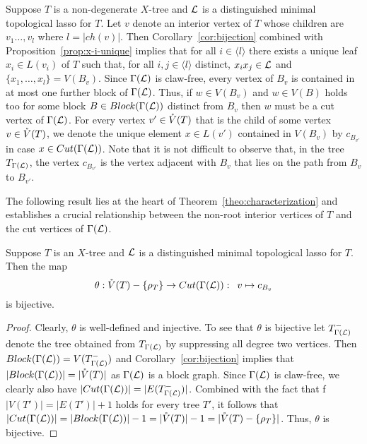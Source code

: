 Suppose $T$ is a non-degenerate $X$-tree and
${\mathcal L}$ is a distinguished minimal topological lasso for $T$. 
Let $v$ denote an interior vertex of $T$ whose children are 
$v_1\ldots,v_l$ where $l=|ch(v)|$. Then
 Corollary~\ref{cor:bijection} combined with 
Proposition~\ref{prop:x-i-unique} implies that for all $i\in\langle l\rangle$
there exists a unique leaf $x_i\in L(v_i)$ of $T$ such that, 
for all $i,j\in\langle l\rangle$ distinct,
 $x_ix_j\in {\mathcal L}$ and 
$\{x_1,\ldots, x_l\}=V(B_v)$. Since $\Gamma({\mathcal L})$ is claw-free, 
every vertex of $B_v$  is contained in at most one further block
of $\Gamma({\mathcal L})$. Thus, if $w\in V(B_v)$ and
$w\in V(B) $ holds too for some block $B\in Block(\Gamma({\mathcal L}))$
distinct from $B_v$
then $w$ must be a cut vertex of $\Gamma({\mathcal L})$. For every 
vertex $v'\in \mathring{V}(T)$ that is the
child of some vertex $v\in \mathring{V}(T)$, we denote the  
unique element $x\in L(v')$ contained
in $V(B_v)$ by $c_{B_{v'}}$ in case $x\in Cut(\Gamma({\mathcal L}))$.
Note that it is not difficult to observe that,  in the tree 
$T_{\Gamma({\mathcal L})}$, the vertex $c_{B_{v'}}$ is the vertex 
adjacent with $B_v$ that lies on the path 
from $B_v$ to $B_{v'}$. 

The following result lies at the heart of 
Theorem~\ref{theo:characterization} and establishes a 
crucial relationship between the non-root interior vertices of $T$ 
and the cut vertices of $\Gamma({\mathcal L})$.

\begin{lem}\label{lem:bijection-theta}
Suppose $T$ is an $X$-tree and ${\mathcal L}$ is a distinguished minimal 
topological lasso
for $T$. Then  the map 
$$
\theta :\mathring{V}(T)-\{\rho_T\} \to Cut(\Gamma({\mathcal L})):\,\,\,v\mapsto c_{B_{v}}
$$ 
is bijective. 
\end{lem}
\begin{proof}
Clearly, $\theta$ is well-defined and injective. To see that $\theta$ is 
bijective
let $ T_{\Gamma({\mathcal L})}^-$ denote the tree obtained from
$ T_{\Gamma({\mathcal L})}$ by suppressing all degree two vertices. Then 
$Block(\Gamma({\mathcal L}))=V(T_{\Gamma({\mathcal L})}^-)$ and 
Corollary~\ref{cor:bijection} implies that
$|Block(\Gamma({\mathcal L}))|=|\mathring{V}(T)|$ 
as $\Gamma({\mathcal L})$ is a block graph. Since
$\Gamma({\mathcal L})$ is claw-free, we clearly also have 
$|Cut(\Gamma({\mathcal L}))|=|E(T_{\Gamma({\mathcal L})}^-)|$. Combined with the
fact that f $|V(T')|= |E(T')|+1$ holds for every tree $T'$,
it follows that 
 $|Cut(\Gamma({\mathcal L}))|=|Block(\Gamma({\mathcal L}))|-1=|\mathring{V}(T)|-1=
 |\mathring{V}(T)-\{\rho_T\}|$. Thus,
$\theta$ is bijective.
\qquad
\end{proof}





